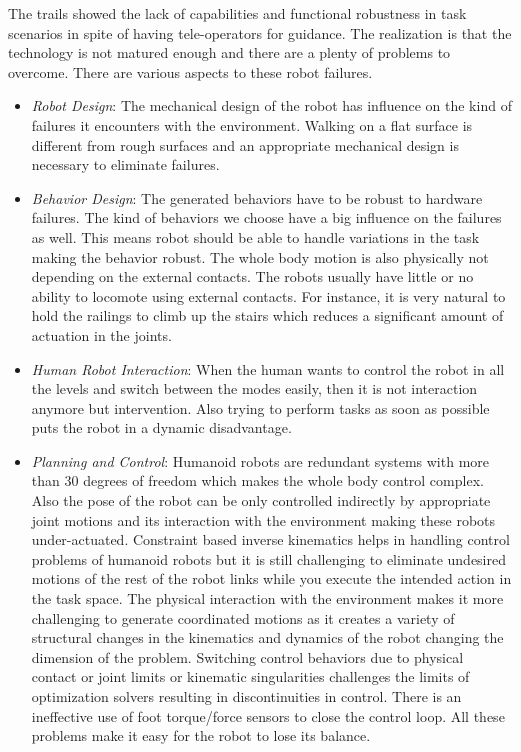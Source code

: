 The trails showed the lack of capabilities and functional robustness in task scenarios in spite of having tele-operators for guidance. The realization is that the technology is not matured enough and there are a plenty of problems to overcome. There are various aspects to these robot failures.
\begin{itemize}
    \item \textit{Robot Design}: The mechanical design of the robot has influence on the kind of failures it encounters with the environment. Walking on a flat surface is different from rough surfaces and an appropriate mechanical design is necessary to eliminate failures.

    \item \textit{Behavior Design}: The generated behaviors have to be robust to hardware failures. The kind of behaviors we choose have a big influence on the failures as well. This means robot should be able to handle variations in the task making the behavior robust. The whole body motion is also physically not depending on the external contacts. The robots usually have little or no ability to locomote using external contacts. For instance, it is very natural to hold the railings to climb up the stairs which reduces a significant amount of actuation in the joints.
    
    \item \textit{Human Robot Interaction}: When the human wants to control the robot in all the levels and switch between the modes easily, then it is not interaction anymore but intervention. Also trying to perform tasks as soon as possible puts the robot in a dynamic disadvantage.       
 
    \item \textit{Planning and Control}: Humanoid robots are redundant systems with more than 30 degrees of freedom which makes the whole body control complex. Also the pose of the robot can be only controlled indirectly by appropriate joint motions and its interaction with the environment making these robots under-actuated. 
    Constraint based inverse kinematics helps in handling control problems of humanoid robots but it is still challenging to eliminate undesired motions of the rest of the robot links while you execute the intended action in the task space. The physical interaction with the environment makes it more challenging to generate coordinated motions as it creates a variety of structural changes in the kinematics and dynamics of the robot changing the dimension of the problem. Switching control behaviors due to physical contact or joint limits or kinematic singularities challenges the limits of optimization solvers resulting in discontinuities in control. There is an ineffective use of foot torque/force sensors to close the control loop. All these problems make it easy for the robot to lose its balance.   
  

\end{itemize}
